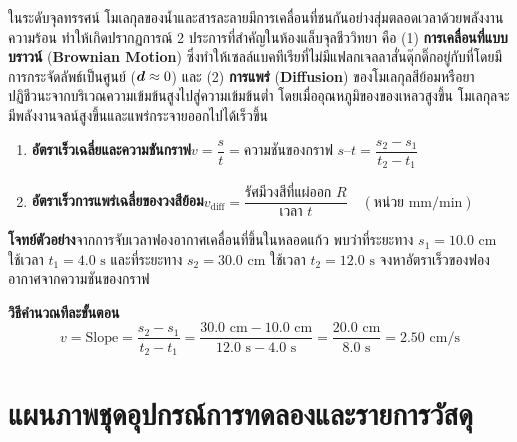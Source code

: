 ในระดับจุลทรรศน์ โมเลกุลของน้ำและสารละลายมีการเคลื่อนที่ชนกันอย่างสุ่มตลอดเวลาด้วยพลังงานความร้อน ทำให้เกิดปรากฏการณ์ 2 ประการที่สำคัญในห้องแล็บจุลชีววิทยา คือ (1) \textbf{การเคลื่อนที่แบบบราวน์} (\textbf{Brownian Motion}) ซึ่งทำให้เซลล์แบคทีเรียที่ไม่มีแฟลกเจลลาสั่นดุ๊กดิ๊กอยู่กับที่โดยมีการกระจัดลัพธ์เป็นศูนย์ ($\bm{d} \approx 0$) และ (2) \textbf{การแพร่} (\textbf{Diffusion}) ของโมเลกุลสีย้อมหรือยาปฏิชีวนะจากบริเวณความเข้มข้นสูงไปสู่ความเข้มข้นต่ำ โดยเมื่ออุณหภูมิของของเหลวสูงขึ้น โมเลกุลจะมีพลังงานจลน์สูงขึ้นและแพร่กระจายออกไปได้เร็วขึ้น

\begin{conceptbox}
\begin{enumerate}
    \item \textbf{อัตราเร็วเฉลี่ยและความชันกราฟ}\quad $v = \dfrac{s}{t} = \text{ความชันของกราฟ } s\text{--}t = \dfrac{s_2 - s_1}{t_2 - t_1}$
    \item \textbf{อัตราเร็วการแพร่เฉลี่ยของวงสีย้อม}\quad $v_{\text{diff}} = \dfrac{\text{รัศมีวงสีที่แผ่ออก } R}{\text{เวลา } t}\quad (\text{หน่วย mm/min})$
\end{enumerate}
\end{conceptbox}

\begin{worked}
\textbf{โจทย์ตัวอย่าง}\quad จากการจับเวลาฟองอากาศเคลื่อนที่ขึ้นในหลอดแก้ว พบว่าที่ระยะทาง $s_1 = 10.0\text{ cm}$ ใช้เวลา $t_1 = 4.0\text{ s}$ และที่ระยะทาง $s_2 = 30.0\text{ cm}$ ใช้เวลา $t_2 = 12.0\text{ s}$ จงหาอัตราเร็วของฟองอากาศจากความชันของกราฟ

\textbf{วิธีคำนวณทีละขั้นตอน}
\[
    v = \text{Slope} = \frac{s_2 - s_1}{t_2 - t_1} = \frac{30.0\text{ cm} - 10.0\text{ cm}}{12.0\text{ s} - 4.0\text{ s}} = \frac{20.0\text{ cm}}{8.0\text{ s}} = 2.50\text{ cm/s}
\]
\end{worked}

\section{แผนภาพชุดอุปกรณ์การทดลองและรายการวัสดุ}

